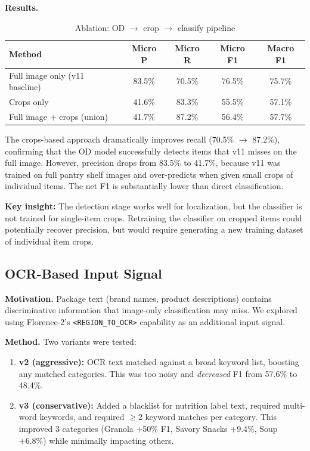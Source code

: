 \textbf{Results.}

\begin{table}[h]
\centering
\caption{Ablation: OD $\rightarrow$ crop $\rightarrow$ classify pipeline}
\label{tab:od_ablation}
\begin{tabular}{lcccc}
\toprule
Method & Micro P & Micro R & Micro F1 & Macro F1 \\
\midrule
Full image only (v11 baseline) & 83.5\% & 70.5\% & 76.5\% & 75.7\% \\
Crops only & 41.6\% & 83.3\% & 55.5\% & 57.1\% \\
Full image + crops (union) & 41.7\% & 87.2\% & 56.4\% & 57.7\% \\
\bottomrule
\end{tabular}
\end{table}

The crops-based approach dramatically improves recall (70.5\% $\rightarrow$ 87.2\%), confirming that the OD model successfully detects items that v11 misses on the full image. However, precision drops from 83.5\% to 41.7\%, because v11 was trained on full pantry shelf images and over-predicts when given small crops of individual items. The net F1 is substantially lower than direct classification.

\textbf{Key insight:} The detection stage works well for localization, but the classifier is not trained for single-item crops. Retraining the classifier on cropped items could potentially recover precision, but would require generating a new training dataset of individual item crops.

\subsection{OCR-Based Input Signal}
\label{ssec:ocr}

\textbf{Motivation.} Package text (brand names, product descriptions) contains discriminative information that image-only classification may miss. We explored using Florence-2's \texttt{<REGION\_TO\_OCR>} capability as an additional input signal.

\textbf{Method.} Two variants were tested:
\begin{enumerate}[nosep,leftmargin=1.5em]
  \item \textbf{v2 (aggressive):} OCR text matched against a broad keyword list, boosting any matched categories. This was too noisy and \textit{decreased} F1 from 57.6\% to 48.4\%.
  \item \textbf{v3 (conservative):} Added a blacklist for nutrition label text, required multi-word keywords, and required $\geq$2 keyword matches per category. This improved 3 categories (Granola +50\% F1, Savory Snacks +9.4\%, Soup +6.8\%) while minimally impacting others.
\end{enumerate}

